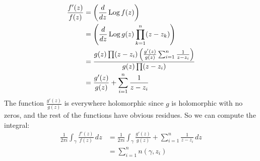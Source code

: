 \documentclass{homework}
\begin{document}
                                                                                  \begin{solution}
                                                                                  \begin{align*}
                                                                                      \frac{f'(z)}{f(z)} &= \left(\frac{d}{dz}\operatorname{Log} f(z)\right) \\
                                                                                          &= \left(\frac{d}{dz}\operatorname{Log} g(z)\prod_{k=1}^n (z-z_k)\right) \\
                                                                                              &=  \frac{g(z)\prod (z-z_i)\left(\frac{g'(z)}{g(z)} \sum_{i=1}^n \frac{1}{z-z_i}\right)}{g(z)\prod (z-z_i)}\\
                                                                                                  &=  \frac{g'(z)}{g(z)} + \sum_{i=1}^n \frac{1}{z-z_i}
                                                                                                  \end{align*}
                                                                                                  The function $\frac{g'(z)}{g(z)}$ is everywhere holomorphic since $g$ is holomorphic with no zeros, and the rest of the functions have obvious residues. So we can compute the integral:
                                                                                                  \begin{align*}
                                                                                                  \frac{1}{2\pi i} \int_\gamma \frac{f'(z)}{f(z)} \, dz &= \frac{1}{2\pi i} \int_\gamma \frac{g'(z)}{g(z)} + \sum_{i=1}^n \frac{1}{z-z_i} \, dz\\
                                                                                                  &= \sum_{i=1}^n n(\gamma, z_i)
                                                                                                  \end{align*}
                                                                                                  \end{solution}
\end{document}
